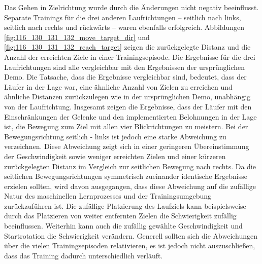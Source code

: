 Das Gehen in Zielrichtung wurde durch die Änderungen nicht negativ beeinflusst. Separate Trainings für die drei anderen Laufrichtungen – seitlich nach links, seitlich nach rechts und rückwärts – waren ebenfalls erfolgreich. Abbildungen \ref{fig:116_130_131_132_move_target_dir} und \ref{fig:116_130_131_132_reach_target} zeigen die zurückgelegte Distanz und die Anzahl der erreichten Ziele in einer Trainingsepisode. Die Ergebnisse für die drei Laufrichtungen sind alle vergleichbar mit den Ergebnissen der ursprünglichen Demo. Die Tatsache, dass die Ergebnisse  \grqq{}vergleichbar \grqq{} sind, bedeutet, dass der Läufer in der Lage war, eine ähnliche Anzahl von Zielen zu erreichen und ähnliche Distanzen zurückzulegen wie in der ursprünglichen Demo, unabhängig von der Laufrichtung. Insgesamt zeigen die Ergebnisse, dass der Läufer mit den Einschränkungen der Gelenke und den implementierten Belohnungen in der Lage ist, die Bewegung zum Ziel mit allen vier Blickrichtungen zu meistern. Bei der Bewegungsrichtung seitlich - links ist jedoch eine starke Abweichung zu verzeichnen. Diese Abweichung zeigt sich in einer geringeren Übereinstimmung der Geschwindigkeit sowie weniger erreichten Zielen und einer kürzeren zurückgelegten Distanz im Vergleich zur seitlichen Bewegung nach rechts. Da die seitlichen Bewegungsrichtungen symmetrisch zueinander identische Ergebnisse erzielen sollten, wird davon ausgegangen, dass diese Abweichung auf die zufällige Natur des maschinellen Lernprozesses und der Trainingsumgebung zurückzuführen ist. Die zufällige Platzierung des Laufziels kann beispielsweise durch das Platzieren von weiter entfernten Zielen die Schwierigkeit zufällig beeinflussen. Weiterhin kann auch die zufällig gewählte Geschwindigkeit und Startrotation die Schwierigkeit verändern. Generell sollten sich die Abweichungen über die vielen Trainingsepisoden relativieren, es ist jedoch nicht auszuschließen, dass das Training dadurch unterschiedlich verläuft.

